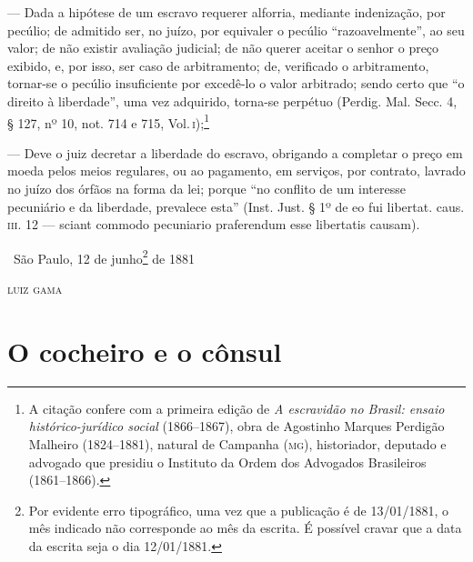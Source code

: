 --- Dada a hipótese de um escravo requerer alforria, mediante
indenização, por pecúlio; de admitido ser, no juízo, por equivaler o
pecúlio ``razoavelmente'', ao seu valor; de não existir avaliação
judicial; de não querer aceitar o senhor o preço exibido, e, por isso,
ser caso de arbitramento; de, verificado o arbitramento, tornar-se o
pecúlio insuficiente por excedê-lo o valor arbitrado; sendo certo que ``o
direito à liberdade'', uma vez adquirido, torna-se perpétuo (Perdig. Mal.
Secc. 4, § 127, nº 10, not. 714 e 715, Vol.\,\textsc{i});\footnote{A citação
  confere com a primeira edição de \emph{A escravidão no Brasil: ensaio
  histórico-jurídico social} (1866--1867), obra de Agostinho Marques
  Perdigão Malheiro (1824--1881), natural de Campanha (\textsc{mg}), historiador,
  deputado e advogado que presidiu o Instituto da Ordem dos Advogados
  Brasileiros (1861--1866).}

--- Deve o juiz decretar a liberdade do escravo, obrigando a completar
o preço em moeda pelos meios regulares, ou ao pagamento, em serviços,
por contrato, lavrado no juízo dos órfãos na forma da lei; porque ``no
conflito de um interesse pecuniário e da liberdade, prevalece esta''
(Inst. Just. § 1º de eo fui libertat. caus. \textsc{iii}. 12 --- sciant commodo
pecuniario praferendum esse libertatis causam). %

\medskip

\hfill\ São Paulo, 12 de junho\footnote{Por evidente erro tipográfico, uma
    vez que a publicação é de 13/01/1881, o mês indicado não corresponde
    ao mês da escrita. É possível cravar que a data da escrita seja o
    dia 12/01/1881.} de 1881

\hfill\textsc{luiz gama}

\part{O cocheiro e o cônsul}


